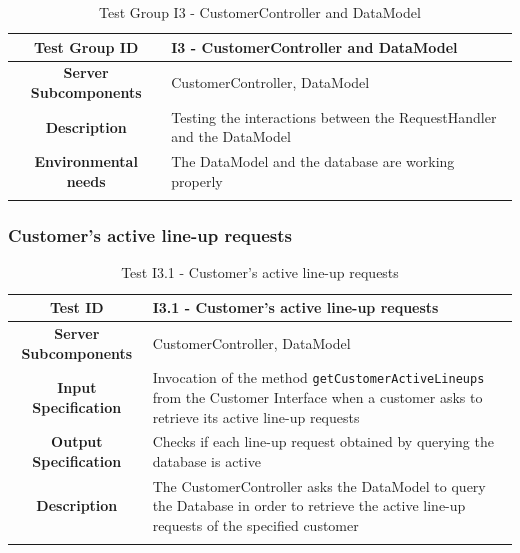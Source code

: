 \documentclass[a4paper,oneside,11pt]{book}
\begin{document}
    \begin{longtable}[c]{|>{\bfseries{}}c|H{.5\textwidth}|}
        \hline
        Test Group ID & I3 - CustomerController and DataModel \\ \hline
        Server Subcomponents & CustomerController, DataModel \\ \hline
        Description & Testing the interactions between the RequestHandler and the DataModel \\ \hline
        Environmental needs & The DataModel and the database are working properly \\ \hline
        \caption{Test Group I3 - CustomerController and DataModel}
        \label{table:test_I3}
    \end{longtable}
    
    \newpage
    \subsubsection{Customer's active line-up requests}
    \begin{longtable}[c]{|>{\bfseries{}}c|H{.5\textwidth}|}
        \hline
        Test ID & I3.1 - Customer's active line-up requests \\ \hline
        Server Subcomponents & CustomerController, DataModel \\ \hline
        Input Specification & Invocation of the method \texttt{getCustomerActiveLineups} from the Customer Interface when a customer asks to retrieve its active line-up requests \\ \hline
        Output Specification & Checks if each line-up request obtained by querying the database is active \\ \hline
        Description & The CustomerController asks the DataModel to query the Database in order to retrieve the active line-up requests of the specified customer \\ \hline
        \caption{Test I3.1 - Customer's active line-up requests}
        \label{table:test_I3.1}
    \end{longtable}
    
\end{document}
